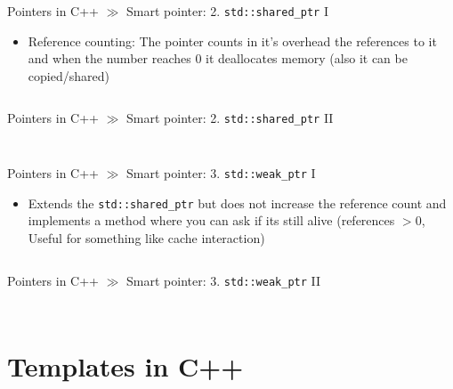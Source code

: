 \documentclass[10pt]{beamer}
\begin{document}
\begin{frame}{Pointers in C++ $\gg$ Smart pointer: 2.  \texttt{std::shared_ptr} I}
\begin{itemize}
	\item Reference counting: The pointer counts in it's overhead the references to it and when the number reaches $0$ it deallocates memory (also it can be copied/shared)
	\inputminted[bgcolor=lightGreyCustom,fontsize=\scriptsize,lastline=17]{cpp}{./resources/shared_ptr.cpp}
\end{itemize}
\end{frame}

\begin{frame}{Pointers in C++ $\gg$ Smart pointer: 2.  \texttt{std::shared_ptr} II}
\begin{itemize}
	\inputminted[bgcolor=lightGreyCustom,fontsize=\scriptsize,firstline=18]{cpp}{./resources/shared_ptr.cpp}
	\vspace{-9mm}
	\inputminted[bgcolor=lightGreyCustom,fontsize=\scriptsize ]{sh}{./resources/build_shared_ptr.sh}
\end{itemize}
\end{frame}

\begin{frame}{Pointers in C++ $\gg$ Smart pointer: 3.  \texttt{std::weak_ptr} I}
\begin{itemize}
	\item Extends the \texttt{std::shared_ptr} but does not increase the reference count and implements a method where you can ask if its still alive (references $> 0$, Useful for something like cache interaction)
	\inputminted[bgcolor=lightGreyCustom,fontsize=\scriptsize,lastline=17]{cpp}{./resources/weak_ptr.cpp}
\end{itemize}
\end{frame}

\begin{frame}{Pointers in C++ $\gg$ Smart pointer: 3.  \texttt{std::weak_ptr} II}
\begin{itemize}
	\inputminted[bgcolor=lightGreyCustom,fontsize=\scriptsize,firstline=18]{cpp}{./resources/weak_ptr.cpp}
	\vspace{-9mm}
	\inputminted[bgcolor=lightGreyCustom,fontsize=\scriptsize ]{sh}{./resources/build_weak_ptr.sh}
\end{itemize}
\end{frame}

\section{Templates in C++}
\end{document}
